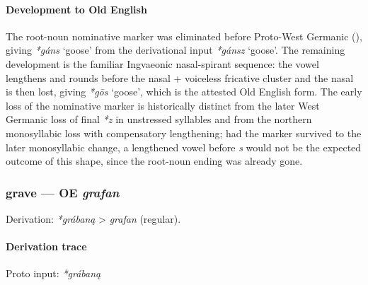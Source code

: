 \documentclass[
  british,
  a4paper,
]{article}
\providecommand{\Recon}[1]{\emph{*#1}}
\begin{document}
\paragraph{Development to Old
English}\label{development-to-old-english-29}

The root-noun nominative marker was eliminated before Proto-West
Germanic (),
giving \Recon{gáns} `goose' from the derivational input \Recon{gánsz}
`goose'. The remaining development is the familiar Ingvaeonic
nasal-spirant sequence: the vowel lengthens and rounds before the nasal
+ voiceless fricative cluster and the nasal is then lost, giving
\Recon{gōs} `goose', which is the attested Old English form. The early
loss of the nominative marker is historically distinct from the later
West Germanic loss of final \emph{*z} in unstressed syllables and from
the northern monosyllabic loss with compensatory lengthening; had the
marker survived to the later monosyllabic change, a lengthened vowel
before \emph{s} would not be the expected outcome of this shape, since
the root-noun ending was already gone.

\subsubsection{\texorpdfstring{grave --- OE
\emph{grafan}}{grave --- OE grafan}}\label{grave-oe-grafan}

Derivation: \emph{*grábaną} \textgreater{} \emph{grafan} (regular).

\paragraph{Derivation trace}\label{derivation-trace-35}

Proto input: \emph{*grábaną}

\begingroup
\setlength{\fboxsep}{6pt}
\end{document}
